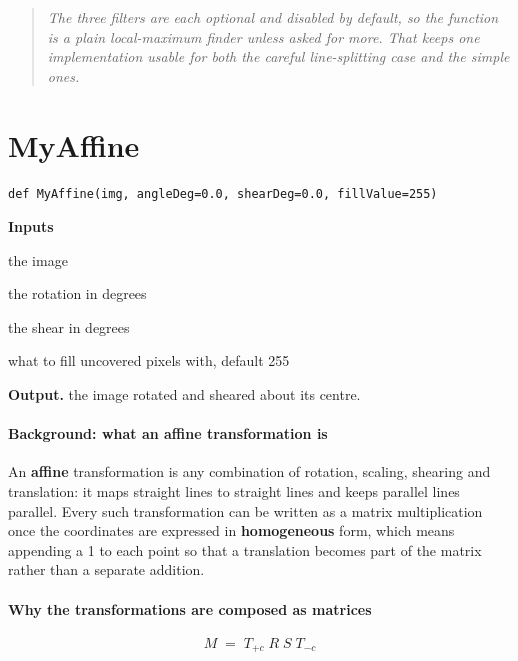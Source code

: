 \begin{quote}\small\itshape The three filters are each optional and disabled by default, so the function is a plain local-maximum finder unless asked for more. That keeps one implementation usable for both the careful line-splitting case and the simple ones.\end{quote}

\section{MyAffine}
\begin{lstlisting}[style=sig]
def MyAffine(img, angleDeg=0.0, shearDeg=0.0, fillValue=255)
\end{lstlisting}

\noindent\textbf{Inputs}
\begin{description}[leftmargin=2.2em,style=nextline,font=\normalfont\ttfamily]\setlength\itemsep{1pt}
  \item[{img}] \normalfont the image
  \item[{angleDeg}] \normalfont the rotation in degrees
  \item[{shearDeg}] \normalfont the shear in degrees
  \item[{fillValue}] \normalfont what to fill uncovered pixels with, default 255
\end{description}

\noindent\textbf{Output.} the image rotated and sheared about its centre.


\paragraph{Background: what an affine transformation is}
An \textbf{affine} transformation is any combination of rotation, scaling, shearing and translation: it maps straight lines to straight lines and keeps parallel lines parallel. Every such transformation can be written as a matrix multiplication once the coordinates are expressed in \textbf{homogeneous} form, which means appending a 1 to each point so that a translation becomes part of the matrix rather than a separate addition.


\paragraph{Why the transformations are composed as matrices}

\begin{equation}
M \;=\; T_{+c} \; R \; S \; T_{-c}
\end{equation}

